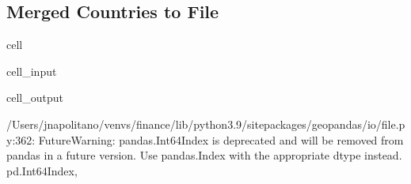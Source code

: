 \documentclass[letterpaper,10pt,english]{jupyterBook}
\begin{document}
\subsection{Merged Countries to File}
\label{\detokenize{notebooks/geo_coding:merged-countries-to-file}}
\begin{sphinxuseclass}{cell}\begin{sphinxVerbatimInput}

\begin{sphinxuseclass}{cell_input}
\begin{sphinxVerbatim}[commandchars=\\\{\}]
  
 
\end{sphinxVerbatim}

\end{sphinxuseclass}\end{sphinxVerbatimInput}
\begin{sphinxVerbatimOutput}

\begin{sphinxuseclass}{cell_output}
\begin{sphinxVerbatim}[commandchars=\\\{\}]
/Users/jnapolitano/venvs/finance/lib/python3.9/site\PYGZhy{}packages/geopandas/io/file.py:362: FutureWarning: pandas.Int64Index is deprecated and will be removed from pandas in a future version. Use pandas.Index with the appropriate dtype instead.
  pd.Int64Index,
\end{sphinxVerbatim}

\end{sphinxuseclass}\end{sphinxVerbatimOutput}

\end{sphinxuseclass}






\renewcommand{\indexname}{Index}
\printindex
\end{document}
